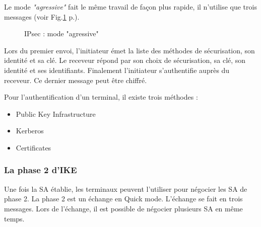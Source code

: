 Le mode \textit{"agressive"} fait le même travail de façon plus rapide, il n'utilise que trois messages (voir Fig.\ref{fig:ipsagg} p.\pageref{fig:ipsagg}).
\begin{figure}[ht]
\centering
{}
\caption{IPsec : mode "agressive"}
\label{fig:ipsagg}
\end{figure} 
Lors du premier envoi, l'initiateur émet la liste des méthodes de sécurisation, son identité et sa clé. 
Le receveur répond par son choix de sécurisation, sa clé, son identité et ses identifiants. 
Finalement l'initiateur s'authentifie auprès du receveur. 
Ce dernier message peut être chiffré.

Pour l'authentification d'un terminal, il existe trois méthodes : 
\begin{itemize}
	\item Public Key Infrastructure 
	\item Kerberos
	\item Certificates
\end{itemize}

\subsubsection{La phase 2 d'IKE}
Une fois la SA établie, les terminaux peuvent l'utiliser pour négocier les SA de phase 2. 
La phase 2 est un échange en Quick mode. 
L'échange se fait en trois messages. 
Lors de l'échange, il est possible de négocier plusieurs SA en même temps. 